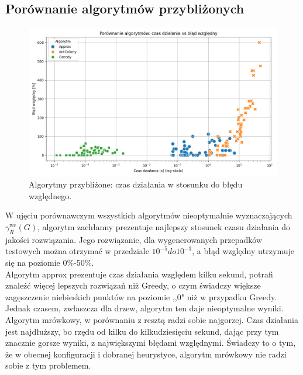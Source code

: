 \subsection{Porównanie algorytmów przybliżonych}

\begin{figure}[H]
    \centering
    \includegraphics[width=\textwidth]{assets/plots_approx/alorithms.png}
    \caption{Algorytmy przybliżone: czas działania w stosunku do błędu względnego.}
    \label{fig:approxPlot}
\end{figure}

W ujęciu porównawczym wszystkich algorytmów nieoptymalnie wyznaczających $\gamma^{\text{wc}}_R(G)$, algorytm zachłanny prezentuje najlepszy stosunek czasu działania do jakości rozwiązania. Jego rozwiązanie, dla wygenerowanych przepadków testowych można otrzymać w przedziale $10^{-5} do 10^{-3}$, a błąd względny utrzymuje się na poziomie 0\%-50\%.\\
Algorytm approx prezentuje czas działania względem kilku sekund, potrafi znaleźć więcej lepszych rozwiązań niż Greedy, o czym świadczy większe zagęszczenie niebieskich punktów na poziomie ,,0" niż w przypadku Greedy. Jednak czasem, zwłaszcza dla drzew, algorytm ten daje nieoptymalne wyniki.\\
Algorytm mrówkowy, w porównaniu z resztą radzi sobie najgorzej. Czas działania jest najdłuższy, bo rzędu od kilku do kilkudziesięciu sekund, dając przy tym znacznie gorsze wyniki, z największymi błędami względnymi. Świadczy to o tym, że w obecnej konfiguracji i dobranej heurystyce, algorytm mrówkowy nie radzi sobie z tym problemem.

